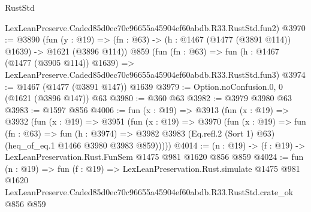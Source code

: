 \begin{lexlean}{RustStd}
\begin{coremodule}
    LexLeanPreserve.Caded85d0ec70c96655a45904ef60abdb.R33.RustStd.fun2)
@3970 := @3890
    (fun (y : @19) => (fn : @63) -> (h : @1467 (@1477 (@3891 @114)) @1639) -> @1621 (@3896 @114))
    @859
    (fun (fn : @63) =>
    fun (h : @1467 (@1477 (@3905 @114)) @1639) =>
    LexLeanPreserve.Caded85d0ec70c96655a45904ef60abdb.R33.RustStd.fun3)
@3974 := @1467 (@1477 (@3891 @147)) @1639
@3979 := Option.noConfusion.{0, 0} (@1621 (@3896 @147)) @63
@3980 := @360 @63
@3982 := @3979 @3980 @63
@3983 := @1597 @856
@4006 := fun (x : @19) =>
  @3913
    (fun (x : @19) =>
    @3932
      (fun (x : @19) =>
      @3951
        (fun (x : @19) =>
        @3970
          (fun (x : @19) =>
          fun (fn : @63) =>
          fun (h : @3974) =>
          @3982 @3983 (Eq.refl.{2} (Sort 1) @63) (heq_of_eq.{1} @1466 @3980 @3983 @859)))))
@4014 := (n : @19) -> (f : @19) -> LexLeanPreservation.Rust.FunSem @1475 @981 @1620 @856 @859
@4024 := fun (n : @19) =>
  fun (f : @19) =>
  LexLeanPreservation.Rust.simulate
    @1475
    @981
    @1620
    LexLeanPreserve.Caded85d0ec70c96655a45904ef60abdb.R33.RustStd.crate_ok
    @856
    @859
\end{coremodule}
\end{lexlean}
